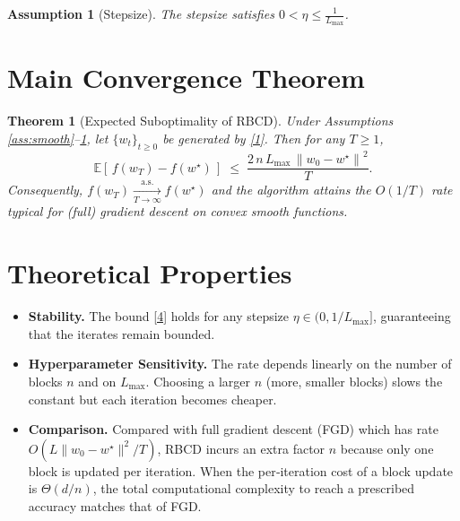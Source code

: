 \documentclass[11pt]{article}
\newtheorem{theorem}{Theorem}
\newtheorem{assumption}{Assumption}
\newcommand{\E}{\mathbb{E}}
\newcommand{\norm}[1]{\left\|#1\right\|}
\begin{document}
\begin{assumption}[Stepsize]\label{ass:stepsize}
The stepsize satisfies $0<\eta\le \frac{1}{L_{\max}}$.
\end{assumption}

\section*{Main Convergence Theorem}
\begin{theorem}[Expected Suboptimality of RBCD]\label{thm:conv}
Under Assumptions \ref{ass:smooth}–\ref{ass:stepsize}, let $\{w_{t}\}_{t\ge0}$ be
generated by \eqref{1}. Then for any $T\ge1$,
\[
\E\!\left[\,f(w_{T})-f(w^{\star})\,\right]
\;\le\;
\frac{2\,n\,L_{\max}\,\norm{w_{0}-w^{\star}}^{2}}{T}.
\tag{4}
\]
Consequently, $f(w_{T})\xrightarrow[T\to\infty]{\text{a.s.}}f(w^{\star})$ and the
algorithm attains the $O(1/T)$ rate typical for (full) gradient descent on
convex smooth functions.
\end{theorem}

\section*{Theoretical Properties}
\begin{itemize}
\item \textbf{Stability.} The bound \eqref{4} holds for any stepsize
$\eta\in(0,1/L_{\max}]$, guaranteeing that the iterates remain bounded.
\item \textbf{Hyperparameter Sensitivity.} The rate depends linearly on the
number of blocks $n$ and on $L_{\max}$. Choosing a larger $n$ (more,
smaller blocks) slows the constant but each iteration becomes cheaper.
\item \textbf{Comparison.} Compared with full gradient descent (FGD) which has
rate $O(L\|w_{0}-w^{\star}\|^{2}/T)$, RBCD incurs an extra factor $n$ because only
one block is updated per iteration. When the per‑iteration cost of a block
update is $\Theta(d/n)$, the total computational complexity to reach a
prescribed accuracy matches that of FGD.
\end{itemize}
\end{document}

